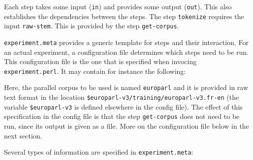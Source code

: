 Each step takes some input ({\tt in}) and provides some output ({\tt out}). This also establishes the dependencies between the steps. The step {\tt tokenize} requires the input {\tt raw-stem}. This is provided by the step {\tt get-corpus}.



{\tt experiment.meta} provides a generic template for steps and their interaction. For an actual experiment, a configuration file determines which steps need to be run. This configuration file is the one that is specified when invocing {\tt experiment.perl}. It may contain for instance the following:






\colorbox{gray}{%
}

Here, the parallel corpus to be used is named {\tt europarl} and it is provided in raw text format in the location {\tt \$europarl-v3/training/europarl-v3.fr-en} (the variable {\tt \$europarl-v3} is defined elsewhere in the config file). The effect of this specification in the config file is that the step {\tt get-corpus} does not need to be run, since its output is given as a file. More on the configuration file below in the next section.



Several types of information are specified in {\tt experiment.meta}:

